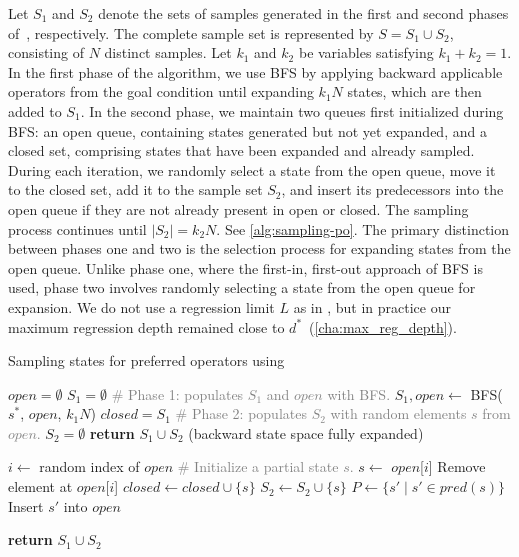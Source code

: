 \documentclass[ppgc,diss,english]{iiufrgs}
\begin{document}
Let $S_1$ and $S_2$ denote the sets of samples generated in the first and second phases of~\bfsrs, respectively. The complete sample set is represented by $S = S_1 \cup S_2$, consisting of $N$ distinct samples. Let $k_1$ and $k_2$ be variables satisfying $k_1 + k_{2} = 1$.
In the first phase of the algorithm, we use BFS by applying backward applicable operators from the goal condition until expanding $k_1N$ states, which are then added to $S_1$.
In the second phase, we maintain two queues first initialized during BFS: an open queue, containing states generated but not yet expanded, and a closed set, comprising states that have been expanded and already sampled. During each iteration, we randomly select a state from the open queue, move it to the closed set, add it to the sample set $S_2$, and insert its predecessors into the open queue if they are not already present in open or closed. The sampling process continues until $|S_2| = k_2N$.
See \cref{alg:sampling-po}. The primary distinction between phases one and two is the selection process for expanding states from the open queue. Unlike phase one, where the first-in, first-out approach of BFS is used, phase two involves randomly selecting a state from the open queue for expansion. We do not use a regression limit $L$ as in \bfsrw, but in practice our maximum regression depth remained close to $d^{*}$~(\vref{cha:max_reg_depth}).

\begin{algorithm}[tb]
\caption{Sampling states for preferred operators using \bfsrs}
\label{alg:sampling-po}
\begin{algorithmic}[1]
  \State $open = \emptyset$
  \State $S_{1} = \emptyset$
  \State \textcolor{gray}{\# Phase 1: populates $S_{1}$ and $open$ with BFS.}
  \State $S_{1}, open \gets$ BFS($s^{*}$, $open$, $k_1N$)
  \State $closed = S_{1}$
  \State \textcolor{gray}{\# Phase 2: populates $S_{2}$ with random elements $s$ from $open$.}
  \State $S_{2} = \emptyset$
      \State \textbf{return} $S_{1} \cup S_{2}$ (backward state space fully expanded)
    \EndIf

    \State $i \gets$ random index of $open$
    \State \textcolor{gray}{\# Initialize a partial state $s$.}
    \State $s \gets$ $open$[$i$]
    \State Remove element at $open$[$i$]
    \State $closed \gets closed \cup \{s\}$
    \State $S_{2} \gets S_{2} \cup \{s\}$
    \State $P \gets \{s' \mid s' \in pred(s)\}$
        \State Insert $s'$ into $open$
      \EndIf
    \EndFor
  \EndWhile

  \State \textbf{return} $S_{1} \cup S_{2}$
\EndProcedure
\end{algorithmic}
\end{algorithm}
\end{document}
